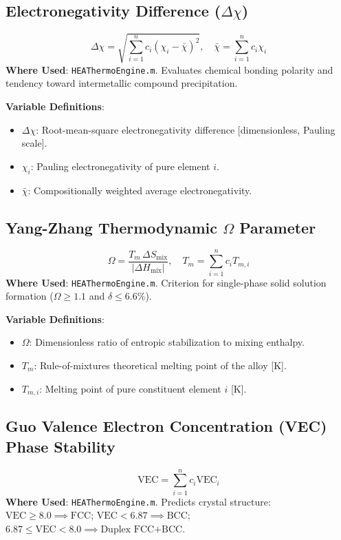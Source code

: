 \documentclass[11pt,a4paper]{article}
\begin{document}
\subsection{Electronegativity Difference ($\Delta\chi$)}
\begin{equation}
\Delta\chi = \sqrt{\sum_{i=1}^n c_i \left(\chi_i - \bar{\chi}\right)^2}, \quad \bar{\chi} = \sum_{i=1}^n c_i \chi_i
\end{equation}
\textbf{Where Used}: \texttt{HEAThermoEngine.m}. Evaluates chemical bonding polarity and tendency toward intermetallic compound precipitation.

\noindent\textbf{Variable Definitions}:
\begin{itemize}
  \item $\Delta\chi$: Root-mean-square electronegativity difference [dimensionless, Pauling scale].
  \item $\chi_i$: Pauling electronegativity of pure element $i$.
  \item $\bar{\chi}$: Compositionally weighted average electronegativity.
\end{itemize}

\subsection{Yang-Zhang Thermodynamic $\Omega$ Parameter}
\begin{equation}
\Omega = \frac{T_m \, \Delta S_{\text{mix}}}{|\Delta H_{\text{mix}}|}, \quad T_m = \sum_{i=1}^n c_i T_{m,i}
\end{equation}
\textbf{Where Used}: \texttt{HEAThermoEngine.m}. Criterion for single-phase solid solution formation ($\Omega \ge 1.1$ and $\delta \le 6.6\%$).

\noindent\textbf{Variable Definitions}:
\begin{itemize}
  \item $\Omega$: Dimensionless ratio of entropic stabilization to mixing enthalpy.
  \item $T_m$: Rule-of-mixtures theoretical melting point of the alloy [$\text{K}$].
  \item $T_{m,i}$: Melting point of pure constituent element $i$ [$\text{K}$].
\end{itemize}

\subsection{Guo Valence Electron Concentration (VEC) Phase Stability}
\begin{equation}
\text{VEC} = \sum_{i=1}^n c_i \text{VEC}_i
\end{equation}
\textbf{Where Used}: \texttt{HEAThermoEngine.m}. Predicts crystal structure: $\text{VEC} \ge 8.0 \implies \text{FCC}$; $\text{VEC} < 6.87 \implies \text{BCC}$; $6.87 \le \text{VEC} < 8.0 \implies \text{Duplex FCC+BCC}$.
\end{document}
